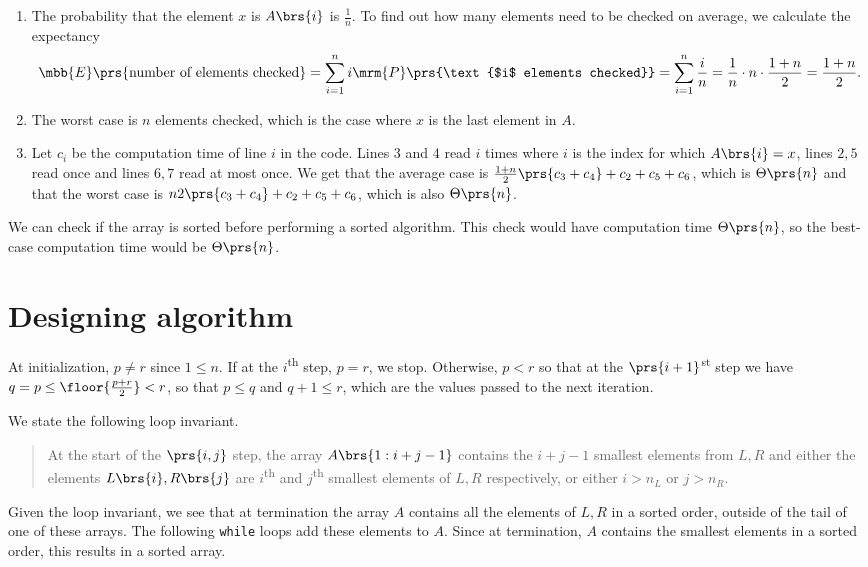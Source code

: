 \documentclass[oneside]{scrbook}
\newcommand{\codeword}[1]{\texttt{#1}}
\theoremstyle{definition}
\begin{document}
\begin{exercise}
    \begin{enumerate}
    \item The probability that the element $x$ is $A\brs{i}$ is $\frac{1}{n}$. To find out how many elements need to be checked on average, we calculate the expectancy
    \[\mbb{E}\prs{\text{number of elements checked}} = \sum_{i = 1}^n i \mrm{P}\prs{\text{$i$ elements checked}} = \sum_{i=1}^n \frac{i}{n} = \frac{1}{n} \cdot n \cdot \frac{1+n}{2} = \frac{1+n}{2} \text{.}\]
    \item The worst case is $n$ elements checked, which is the case where $x$ is the last element in $A$.
    \item Let $c_i$ be the computation time of line $i$ in the code. Lines $3$ and $4$ read $i$ times where $i$ is the index for which $A\brs{i} = x$, lines $2, 5$ read once and lines $6,7$ read at most once. We get that the average case is $\frac{1+n}{2}\prs{c_3 + c_4} + c_2 + c_5 + c_6$, which is $\Theta\prs{n}$ and that the worst case is $n{2}\prs{c_3 + c_4} + c_2 + c_5 + c_6$, which is also $\Theta\prs{n}$.
    \end{enumerate}
\end{exercise}

\begin{exercise}
    We can check if the array is sorted before performing a sorted algorithm. This check would have computation time $\Theta\prs{n}$, so the best-case computation time would be $\Theta\prs{n}$.
\end{exercise}

\section{Designing algorithm}

\begin{exercise}
    At initialization, $p \neq r$ since $1 \leq n$. If at the $i$\textsuperscript{th} step, $p = r$, we stop. Otherwise, $p < r$ so that at the $\prs{i+1}$\textsuperscript{st} step we have $q = p \leq \floor{\frac{p + r}{2}} < r$, so that $p \leq q$ and $q+1 \leq r$, which are the values passed to the next iteration.
\end{exercise}

\begin{exercise}
    We state the following loop invariant.

    \begin{quote}
        At the start of the $\prs{i,j}$ step, the array $A\brs{1 : i+j-1}$ contains the $i+j-1$ smallest elements from $L,R$ and either the elements $L\brs{i},R\brs{j}$ are $i$\textsuperscript{th} and $j$\textsuperscript{th} smallest elements of $L,R$ respectively, or either $i > n_L$ or $j > n_R$.
    \end{quote}

    Given the loop invariant, we see that at termination the array $A$ contains all the elements of $L,R$ in a sorted order, outside of the tail of one of these arrays. The following \codeword{while} loops add these elements to $A$. Since at termination, $A$ contains the smallest elements in a sorted order, this results in a sorted array.
\end{exercise}
\end{document}
